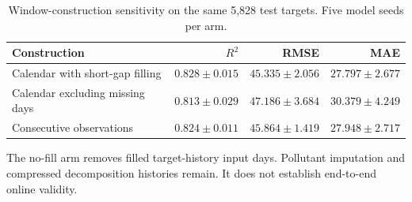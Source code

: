\begin{table}[!htbp]
\centering
\caption{Window-construction sensitivity on the same 5,828 test targets. Five model seeds per arm.}\label{tab:gaps}
\setlength{\tabcolsep}{4pt}
\begin{tabular}{lrrr}
\toprule
Construction & $R^2$ & RMSE & MAE \\
\midrule
Calendar with short-gap filling & $0.828 \pm 0.015$ & $45.335 \pm 2.056$ & $27.797 \pm 2.677$ \\
Calendar excluding missing days & $0.813 \pm 0.029$ & $47.186 \pm 3.684$ & $30.379 \pm 4.249$ \\
Consecutive observations & $0.824 \pm 0.011$ & $45.864 \pm 1.419$ & $27.948 \pm 2.717$ \\
\bottomrule
\end{tabular}
\par\smallskip\begin{minipage}{0.98\linewidth}\footnotesize The no-fill arm removes filled target-history input days. Pollutant imputation and compressed decomposition histories remain. It does not establish end-to-end online validity.\end{minipage}
\end{table}
